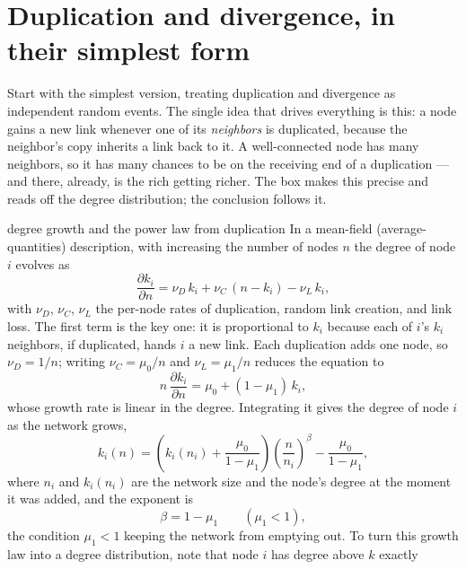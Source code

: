 \section{Duplication and divergence, in their simplest form}

Start with the simplest version, treating duplication and divergence as
independent random events. The single idea that drives everything is this: a node
gains a new link whenever one of its \emph{neighbors} is duplicated, because the
neighbor's copy inherits a link back to it. A well-connected node has many
neighbors, so it has many chances to be on the receiving end of a duplication ---
and there, already, is the rich getting richer. The box makes this precise and
reads off the degree distribution; the conclusion follows it.

\begin{calculation}{degree growth and the power law from duplication}
In a mean-field (average-quantities) description, with increasing the number of
nodes $n$ the degree of node $i$ evolves as
\begin{equation}
  \frac{\partial k_i}{\partial n}
    = \nu_D\, k_i + \nu_C\,(n - k_i) - \nu_L\, k_i,
  \label{eq:dup-master}
\end{equation}
with $\nu_D$, $\nu_C$, $\nu_L$ the per-node rates of duplication, random link
creation, and link loss. The first term is the key one: it is proportional to
$k_i$ because each of $i$'s $k_i$ neighbors, if duplicated, hands $i$ a new link.
Each duplication adds one node, so $\nu_D = 1/n$; writing $\nu_C=\mu_0/n$ and
$\nu_L=\mu_1/n$ reduces the equation to
\begin{equation}
  n\,\frac{\partial k_i}{\partial n} = \mu_0 + (1-\mu_1)\, k_i,
  \label{eq:dup-reduced}
\end{equation}
whose growth rate is linear in the degree. Integrating it gives the degree of
node $i$ as the network grows,
\begin{equation}
  k_i(n) = \left(k_i(n_i) + \frac{\mu_0}{1-\mu_1}\right)
           \left(\frac{n}{n_i}\right)^{\beta} - \frac{\mu_0}{1-\mu_1},
  \label{eq:dup-growth}
\end{equation}
where $n_i$ and $k_i(n_i)$ are the network size and the node's degree at the
moment it was added, and the exponent is
\begin{equation}
  \beta = 1 - \mu_1 \qquad (\mu_1 < 1),
  \label{eq:dup-beta}
\end{equation}
the condition $\mu_1<1$ keeping the network from emptying out. To turn this growth
law into a degree distribution, note that node $i$ has degree above $k$ exactly

\end{calculation}
